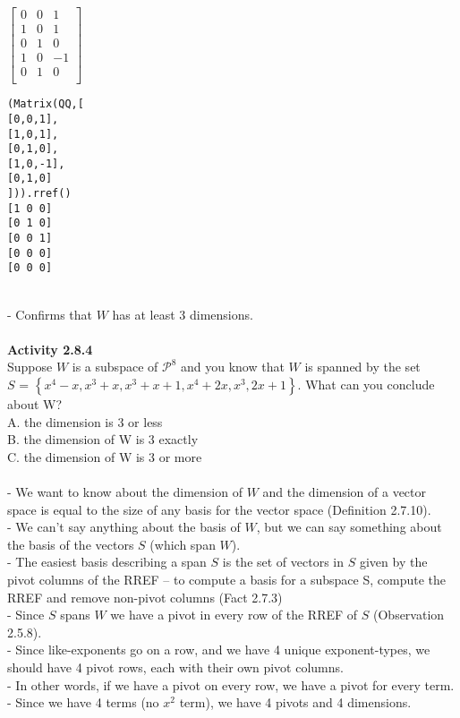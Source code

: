 \documentclass{article}
\begin{document}
$\left[ \begin{matrix} 
0 & 0 & 1\\
1 & 0 & 1\\
0 & 1 & 0\\
1 &0 &-1\\
0 &1& 0 \\
\end{matrix} \right]$
\begin{verbatim}
(Matrix(QQ,[
[0,0,1],
[1,0,1],
[0,1,0],
[1,0,-1],
[0,1,0]
])).rref()
[1 0 0]
[0 1 0]
[0 0 1]
[0 0 0]
[0 0 0]
\end{verbatim}\\
- Confirms that $W$ has at least 3 dimensions.\\
\\
\noindent \textbf{Activity 2.8.4} \\
Suppose $W$ is a subspace of $\mathcal{P}^{8}$ and you know that $W$ is spanned by the set\\
$S$ = $\left\{ x^{4} -x, x^{3} + x, x^{3} + x + 1, x^{4} + 2x, x^{3}, 2x + 1 \right\}$. What can you conclude about W?\\
A. the dimension is 3 or less\\
B. the dimension of W is 3 exactly\\
C. the dimension of W is 3 or more\\
\\
- We want to know about the dimension of $W$ and the dimension of a vector space is equal to the size of any basis for the vector space (Definition 2.7.10).\\
- We can't say anything about the basis of $W$, but we can say something about the basis of the vectors $S$ (which span $W$).\\
- The easiest basis describing a span $S$ is the set of vectors in $S$ given by the pivot columns of the RREF -- to compute a basis for a subspace S, compute the RREF and remove non-pivot columns (Fact 2.7.3) \\
- Since $S$ spans $W$ we have a pivot in every row of the RREF of $S$ (Observation 2.5.8).\\
- Since like-exponents go on a row, and we have 4 unique exponent-types, we should have 4 pivot rows, each with their own pivot columns.\\
- In other words, if we have a pivot on every row, we have a pivot for every term.\\
- Since we have 4 terms (no $x^{2}$ term), we have 4 pivots and 4 dimensions.\\
\\
\end{document}
